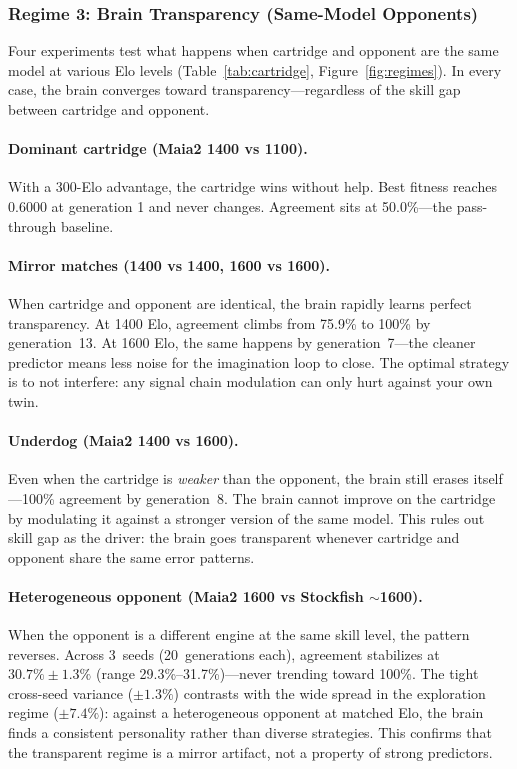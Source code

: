 \documentclass[11pt,a4paper]{article}
\begin{document}
\subsubsection{Regime 3: Brain Transparency (Same-Model Opponents)}

Four experiments test what happens when cartridge and opponent are the same model at various Elo levels (Table~\ref{tab:cartridge}, Figure~\ref{fig:regimes}).
In every case, the brain converges toward transparency---regardless of the skill gap between cartridge and opponent.

\paragraph{Dominant cartridge (Maia2 1400 vs 1100).}
With a 300-Elo advantage, the cartridge wins without help.
Best fitness reaches 0.6000 at generation 1 and never changes.
Agreement sits at 50.0\%---the pass-through baseline.

\paragraph{Mirror matches (1400 vs 1400, 1600 vs 1600).}
When cartridge and opponent are identical, the brain rapidly learns perfect transparency.
At 1400 Elo, agreement climbs from 75.9\% to 100\% by generation~13.
At 1600 Elo, the same happens by generation~7---the cleaner predictor means less noise for the imagination loop to close.
The optimal strategy is to not interfere: any signal chain modulation can only hurt against your own twin.

\paragraph{Underdog (Maia2 1400 vs 1600).}
Even when the cartridge is \emph{weaker} than the opponent, the brain still erases itself---100\% agreement by generation~8.
The brain cannot improve on the cartridge by modulating it against a stronger version of the same model.
This rules out skill gap as the driver: the brain goes transparent whenever cartridge and opponent share the same error patterns.

\paragraph{Heterogeneous opponent (Maia2 1600 vs Stockfish $\sim$1600).}
When the opponent is a different engine at the same skill level, the pattern reverses.
Across 3~seeds (20~generations each), agreement stabilizes at $30.7\% \pm 1.3\%$ (range 29.3\%--31.7\%)---never trending toward 100\%.
The tight cross-seed variance ($\pm 1.3\%$) contrasts with the wide spread in the exploration regime ($\pm 7.4\%$): against a heterogeneous opponent at matched Elo, the brain finds a consistent personality rather than diverse strategies.
This confirms that the transparent regime is a mirror artifact, not a property of strong predictors.
\end{document}
